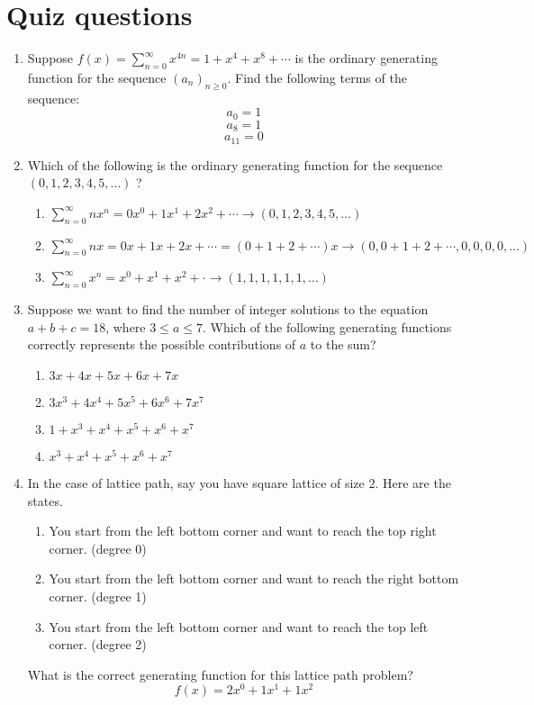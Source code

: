 \documentclass{article}
\theoremstyle{definition}
\begin{document}
\newpage




\section*{Quiz questions}

\begin{enumerate}
  \item Suppose $f(x)=\sum_{n=0}^{\infty} x^{4 n}=1+x^{4}+x^{8}+\cdots$ 
  is the ordinary generating function for the 
  sequence $\left(a_n\right)_{n \geq 0}$. 
  Find the following terms of the sequence:
  $$
  a_0=1
  $$
  $$
  a_8=1
  $$
  $$
  a_{11}=0
  $$
  \item Which of the following is the ordinary 
  generating function for the sequence 
  $(0,1,2,3,4,5, \ldots)$ ?
\begin{enumerate}
  \item $\sum_{n=0}^{\infty} n x^n = {0} x^{0}+{1} x^{1}+{2} x^{2}+\cdots \to (0,1,2,3,4,5, \ldots)$
  \item $\sum_{n=0}^{\infty} n x = {0} x+{1} x+{2} x+\cdots = ({0} +{1}+{2} +\cdots) x \to  (0,0+1+2+\cdots,0,0,0,0, \ldots)$
  \item $\sum_{n=0}^{\infty} x^n = x^{0} + x^{1} + x^{2} + \cdot \to (1,1,1,1,1,1, \ldots)$
\end{enumerate}
  \item Suppose we want to find the number of integer solutions to the equation $a+b+c=18$, where $3 \leq a \leq 7$. Which of the following generating functions correctly represents the possible contributions of $a$ to the sum?
\begin{enumerate}
  \item $3 x+4 x+5 x+6 x+7 x$
  \item $3 x^3+4 x^4+5 x^5+6 x^6+7 x^7$
  \item $1+x^3+x^4+x^5+x^6+x^7$
  \item $x^3+x^4+x^5+x^6+x^7$
\end{enumerate}


\item In the case of lattice path, say you have square lattice of size $2$.
Here are the states.
\begin{enumerate}
  \item You start from the left bottom corner and want to reach the top right corner. (degree 0)
  \item You start from the left bottom corner and want to reach the right bottom corner. (degree 1)
  \item You start from the left bottom corner and want to reach the top left corner. (degree 2)
\end{enumerate}
What is the correct generating function for this lattice path problem?
\[
  f(x) = 2x^{0} + 1x^{1} + 1x^{2}
\]


\end{enumerate}
\end{document}

